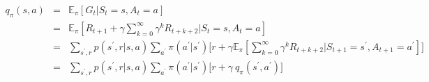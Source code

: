 \documentclass{article}
\begin{document}
\thispagestyle{empty}
\begin{eqnarray*}
q_{\pi}(s,a) &=& \mathbb{E}_{\pi} [G_t|S_t=s,A_t=a] \\
&=& \mathbb{E}_\pi[R_{t+1}+\gamma\sum_{k=0}^{\infty}\gamma^kR_{t+k+2}|S_t=s,A_t=a]\\
&=& \sum_{s^{'},r} p(s^{'},r|s,a) \sum_{a^{'}}\pi(a^{'}|s^{'}) \Big[ r+\gamma\mathbb{E}_{\pi}[\sum_{k=0}^{\infty}\gamma^kR_{t+k+2}|S_{t+1}=s^{'},A_{t+1}=a^{'}] \Big]\\
&=& \sum_{s^{'},r} p(s^{'},r|s,a) \sum_{a^{'}}\pi(a^{'}|s^{'}) \Big[ r+\gamma \ q_{\pi}(s^{'},a^{'})\Big]
\end{eqnarray*}
\end{document}
